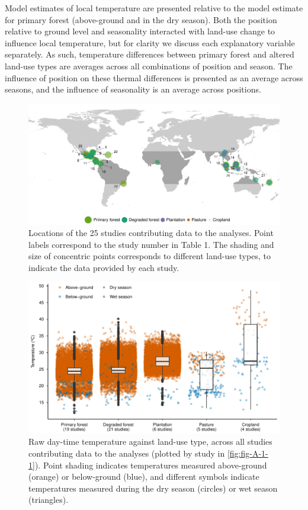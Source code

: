 \documentclass[12pt,a4paper,]{report}
\theoremstyle{definition}
\theoremstyle{definition}
\theoremstyle{definition}
\theoremstyle{remark}
\begin{document}
Model estimates of local temperature are presented relative to the model
estimate for primary forest (above-ground and in the dry season). Both
the position relative to ground level and seasonality interacted with
land-use change to influence local temperature, but for clarity we
discuss each explanatory variable separately. As such, temperature
differences between primary forest and altered land-use types are
averages across all combinations of position and season. The influence
of position on these thermal differences is presented as an average
across seasons, and the influence of seasonality is an average across
positions.

\begin{figure}
\includegraphics{./figures/fig-2-1-1} \caption{Locations of the 25 studies contributing data to the analyses. Point labels correspond to the study number in  Table 1. The shading and size of concentric points corresponds to different land-use types, to indicate the data provided by each study.}\label{fig:fig-2-1}
\end{figure}

\begin{figure}
\centering
\includegraphics{figs/fig2.2.pdf}
\caption{\label{fig:fig-2-2}Raw day-time temperature against land-use type, across all studies contributing data to the analyses (plotted by study in \autoref{fig:fig-A-1-1}). Point shading indicates temperatures measured above-ground (orange) or below-ground (blue), and different symbols indicate temperatures measured during the dry season (circles) or wet season (triangles).}
\end{figure}
\end{document}
